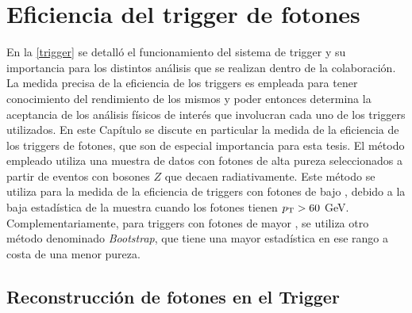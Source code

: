 \chapter{Eficiencia del trigger de fotones}



En la \autoref{trigger} se detalló el funcionamiento del sistema de trigger y su importancia para los distintos análisis que se realizan dentro de la colaboración. La medida precisa de la eficiencia de los triggers es empleada para tener conocimiento del rendimiento de los mismos y poder entonces determina la aceptancia de los análisis físicos de interés que involucran cada uno de los triggers utilizados. 
En este Capítulo se discute en particular la medida de la eficiencia de los triggers de fotones, que son de especial importancia para esta tesis. El método empleado utiliza una muestra de datos con fotones de alta pureza seleccionados a partir de eventos con bosones $Z$ que decaen radiativamente. Este método se utiliza para la medida de la eficiencia de triggers con fotones de bajo \pt, debido a la baja estadística de la muestra cuando los fotones tienen $p_{\text{T}}>60$ GeV. Complementariamente, para triggers con fotones de mayor \pt, se utiliza otro método denominado \textit{Bootstrap}, que tiene una mayor estadística en ese rango a costa de una menor pureza. 


\section{Reconstrucción de fotones en el Trigger}

